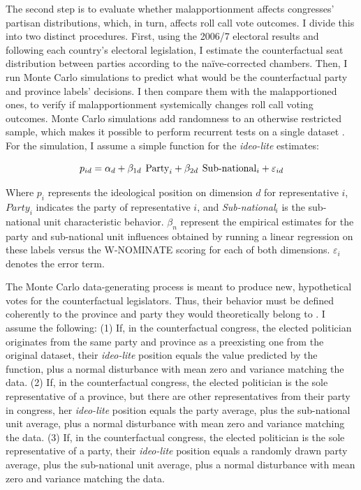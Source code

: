 \documentclass[a4paper,12pt]{article}
\begin{document}
The second step is to evaluate whether malapportionment affects congresses' partisan distributions, which, in turn, affects roll call vote outcomes. I divide this into two distinct procedures. First, using the 2006/7 electoral results and following each country's electoral legislation, I estimate the counterfactual seat distribution between parties according to the naïve-corrected chambers. Then, I run Monte Carlo simulations to predict what would be the counterfactual party and province labels' decisions. I then compare them with the malapportioned ones, to verify if malapportionment systemically changes roll call voting outcomes. Monte Carlo simulations add randomness to an otherwise restricted sample, which makes it possible to perform recurrent tests on a single dataset \citep{johnson2011monte}. For the simulation, I assume a simple function for the \textit{ideo-lite} estimates:

\begin{equation}
p_{id} = \alpha_d + \beta_{1d} \hspace{.15cm} \text{Party}_i + \beta_{2d} \hspace{.15cm} \text{Sub-national}_i + \varepsilon_{id}
\label{eq:mc}
\end{equation}

Where $p_{i}$ represents the ideological position on dimension $d$ for representative $i$, $Party_i$ indicates the party of representative $i$, and \textit{Sub-national}$_i$ is the sub-national unit characteristic behavior. $\beta_n$ represent the empirical estimates for the party and sub-national unit influences obtained by running a linear regression on these labels versus the W-NOMINATE scoring for each of both dimensions. $\varepsilon_i$ denotes the error term. 

The Monte Carlo data-generating process is meant to produce new, hypothetical votes for the counterfactual legislators. Thus, their behavior must be defined coherently to the province and party they would theoretically belong to \citep{carsey2015can}. I assume the following: (1) If, in the counterfactual congress, the elected politician originates from the same party and province as a preexisting one from the original dataset, their \textit{ideo-lite} position equals the value predicted by the function, plus a normal disturbance with mean zero and variance matching the data. (2) If, in the counterfactual congress, the elected politician is the sole representative of a province, but there are other representatives from their party in congress, her \textit{ideo-lite} position equals the party average, plus the sub-national unit average, plus a normal disturbance with mean zero and variance matching the data. (3) If, in the counterfactual congress, the elected politician is the sole representative of a party, their \textit{ideo-lite} position equals a randomly drawn party average, plus the sub-national unit average, plus a normal disturbance with mean zero and variance matching the data.
 
\end{document}
